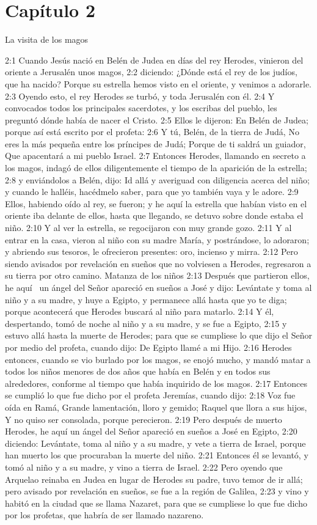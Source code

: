 \section*{Capítulo 2}
La visita de los magos 

2:1 Cuando Jesús nació en Belén de Judea en días del rey Herodes, vinieron del oriente a Jerusalén unos magos, 
2:2 diciendo: ¿Dónde está el rey de los judíos, que ha nacido? Porque su estrella hemos visto en el oriente, y venimos a adorarle. 
2:3 Oyendo esto, el rey Herodes se turbó, y toda Jerusalén con él. 
2:4 Y convocados todos los principales sacerdotes, y los escribas del pueblo, les preguntó dónde había de nacer el Cristo. 
2:5 Ellos le dijeron: En Belén de Judea; porque así está escrito por el profeta: 
2:6 Y tú, Belén, de la tierra de Judá, 
No eres la más pequeña entre los príncipes de Judá; 
Porque de ti saldrá un guiador, 
Que apacentará a mi pueblo Israel. 
2:7 Entonces Herodes, llamando en secreto a los magos, indagó de ellos diligentemente el tiempo de la aparición de la estrella; 
2:8 y enviándolos a Belén, dijo: Id allá y averiguad con diligencia acerca del niño; y cuando le halléis, hacédmelo saber, para que yo también vaya y le adore. 
2:9 Ellos, habiendo oído al rey, se fueron; y he aquí la estrella que habían visto en el oriente iba delante de ellos, hasta que llegando, se detuvo sobre donde estaba el niño. 
2:10 Y al ver la estrella, se regocijaron con muy grande gozo. 
2:11 Y al entrar en la casa, vieron al niño con su madre María, y postrándose, lo adoraron; y abriendo sus tesoros, le ofrecieron presentes: oro, incienso y mirra. 
2:12 Pero siendo avisados por revelación en sueños que no volviesen a Herodes, regresaron a su tierra por otro camino. 
Matanza de los niños 
2:13 Después que partieron ellos, he aquí  un ángel del Señor apareció en sueños a José y dijo: Levántate y toma al niño y a su madre, y huye a Egipto, y permanece allá hasta que yo te diga; porque acontecerá que Herodes buscará al niño para matarlo. 
2:14 Y él, despertando, tomó de noche al niño y a su madre, y se fue a Egipto, 
2:15 y estuvo allá hasta la muerte de Herodes; para que se cumpliese lo que dijo el Señor por medio del profeta, cuando dijo: De Egipto llamé a mi Hijo. 
2:16 Herodes entonces, cuando se vio burlado por los magos, se enojó mucho, y mandó matar a todos los niños menores de dos años que había en Belén y en todos sus alrededores, conforme al tiempo que había inquirido de los magos. 
2:17 Entonces se cumplió lo que fue dicho por el profeta Jeremías, cuando dijo: 
2:18 Voz fue oída en Ramá, 
Grande lamentación, lloro y gemido; 
Raquel que llora a sus hijos, 
Y no quiso ser consolada, porque perecieron. 
2:19 Pero después de muerto Herodes, he aquí un ángel del Señor apareció en sueños a José en Egipto, 
2:20 diciendo: Levántate, toma al niño y a su madre, y vete a tierra de Israel, porque han muerto los que procuraban la muerte del niño. 
2:21 Entonces él se levantó, y tomó al niño y a su madre, y vino a tierra de Israel. 
2:22 Pero oyendo que Arquelao reinaba en Judea en lugar de Herodes su padre, tuvo temor de ir allá; pero avisado por revelación en sueños, se fue a la región de Galilea, 
2:23 y vino y habitó en la ciudad que se llama Nazaret, para que se cumpliese lo que fue dicho por los profetas, que habría de ser llamado nazareno. 
